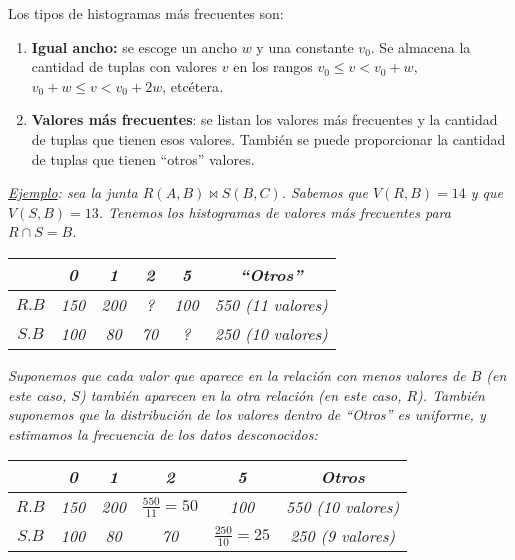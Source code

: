 \documentclass[a4paper, twoside]{article}
\begin{document}
Los tipos de histogramas más frecuentes son:
\begin{enumerate}
\item \textbf{Igual ancho:} se escoge un ancho $w$ y una constante $v_{0}$.
Se almacena la cantidad de tuplas con valores $v$ en los rangos\emph{
$v_{0}\leq v<v_{0}+w,$ $v_{0}+w\leq v<v_{0}+2w$}, etcétera\emph{.}
\item \textbf{Valores más frecuentes}: se listan los valores más frecuentes
y la cantidad de tuplas que tienen esos valores. También se puede
proporcionar la cantidad de tuplas que tienen ``otros'' valores.
\end{enumerate}
\emph{\uline{Ejemplo}}\emph{: sea la junta $R(A,B)\bowtie S(B,C)$.
Sabemos que $V(R,B)=14$ y que $V(S,B)=13$. Tenemos los histogramas
de valores más frecuentes para $R\cap S=B$.}

\noindent \begin{center}
\emph{}%
\begin{tabular}{|c|c|c|c|c|c|}
\hline 
 & \emph{0} & \emph{1} & \emph{2} & \emph{5} & \emph{``Otros''}\\
\hline 
\hline 
\emph{$R.B$} & \emph{150} & \emph{200} & \emph{?} & \emph{100} & \emph{550 (11 valores)}\\
\hline 
\emph{$S.B$} & \emph{100} & \emph{80} & \emph{70} & \emph{?} & \emph{250 (10 valores)}\\
\hline 
\end{tabular}
\par\end{center}

\emph{Suponemos que cada valor que aparece en la relación con menos
valores de $B$ (en este caso, $S$) también aparecen en la otra relación
(en este caso, $R$). También suponemos que la distribución de los
valores dentro de ``Otros'' es uniforme, y estimamos la frecuencia
de los datos desconocidos:}

\noindent \begin{center}
\emph{}%
\begin{tabular}{|c|c|c|c|c|c|}
\hline 
 & \emph{0} & \emph{1} & \emph{2} & \emph{5} & \emph{Otros}\\
\hline 
\hline 
\emph{$R.B$} & \emph{150} & \emph{200} & \emph{$\frac{550}{11}=50$} & \emph{100} & \emph{550 (10 valores)}\\
\hline 
\emph{$S.B$} & \emph{100} & \emph{80} & \emph{70} & \emph{$\frac{250}{10}=25$} & \emph{250 (9 valores)}\\
\hline 
\end{tabular}
\par\end{center}
\end{document}
